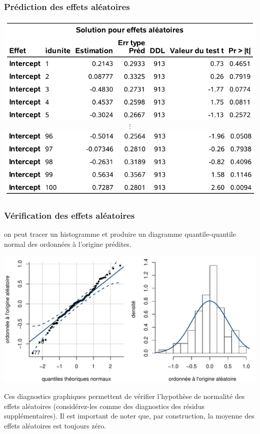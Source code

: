 \documentclass{beamer}
\begin{document}
\begin{frame}
\frametitle{Prédiction des effets aléatoires}
\begin{center}
\includegraphics[width = 0.7\linewidth]{img/c6/diapos7-e19}
\begin{align*}
 \vdots
\end{align*}
\includegraphics[width = 0.7\linewidth]{img/c6/diapos7-e20}
\end{center}
\end{frame}

%
%
\begin{frame}
\frametitle{Vérification des effets aléatoires}
on peut tracer un histogramme et produire un diagramme quantile-quantile normal des ordonnées à l'origine prédites.
\begin{center}
\includegraphics[width = 0.8 \linewidth]{img/c6/07-mixed-diagran_fr}
\end{center}
Ces diagnostics graphiques permettent de vérifier l'hypothèse de normalité des effets aléatoires (considérez-les comme des diagnostics des résidus supplémentaires). Il est important de noter que, par construction, la moyenne des effets aléatoires est toujours zéro.
\end{frame}
\end{document}
